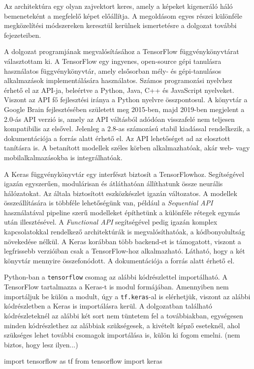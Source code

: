 Az architektúra egy olyan zajvektort keres, amely a képeket kigeneráló háló bemeneteként a megfelelő képet előállítja.
A megoldásom egyes részei különféle megközelítési módszereken keresztül kerülnek ismertetésre a dolgozat további fejezeteiben.



A dolgozat programjának megvalósításához a TensorFlow függvénykönyvtárat választottam ki. A TensorFlow egy ingyenes, open-source gépi tanulásra használatos függvénykönyvtár, amely elsősorban mély- és gépi-tanulásos alkalmazások implementálására használatos. Számos programozási nyelvhez érhető el az API-ja, beleértve a Python, Java, C++ és JavaScript nyelveket. Viszont az API fő fejlesztési iránya a Python nyelvre összpontosul. A könyvtár a Google Brain fejlesztésében született meg 2015-ben, majd 2019-ben megjelent a 2.0-ás API verzió is, amely az API váltásból adódóan visszafelé nem teljesen kompatibilis az elsővel. Jelenleg a 2.8-as számozású stabil kiadással rendelkezik, a dokumentációja a \cite{tensorflow} forrás alatt érhető el. Az API lehetőséget ad az elosztott tanításra is. A betanított modellek széles körben alkalmazhatóak, akár web- vagy mobilalkalmazásokba is integrálhatóak. 

A Keras függvénykönyvtár egy interfészt biztosít a TensorFlowhoz. Segítségével igazán egyszerűen, modulárisan és átláthatóan állíthatunk össze neurális hálózatokat. Az általa biztosított eszközkészlet igazán változatos. A modellek összeállítására is többféle lehetőségünk van, például a \textit{Sequential API} használatával pipeline szerű modelleket építhetünk a különféle rétegek egymás után illesztésével. A \textit{Functional API} segítségével pedig igazán komplex kapcsolatokkal rendelkező architektúrák is megvalósíthatóak, a kódbonyolultság növekedése nélkül. A Keras korábban több backend-et is támogatott, viszont a legfrissebb verzióiban csak a TensorFlow-hoz alkalmazható. Látható, hogy a két könyvtár mennyire összefonódott. A dokumentációja a \cite{keras} forrás alatt érhető el.

Python-ban a \texttt{tensorflow} csomag az alábbi kódrészlettel importálható. A TensorFlow tartalmazza a Keras-t is modul formájában. Amennyiben nem importáljuk be külön a modult, úgy a \texttt{tf.keras}-al is elérhetjük, viszont az alábbi kódrészletben a Keras is importálásra kerül. A dolgozatban található kódrészleteknél az alábbi két sort nem tüntetem fel a továbbiakban, egységesen minden kódrészlethez az alábbiak szükségesek, a kivételt képző eseteknél, ahol szükséges lehet további csomagok importálása is, külön ki fogom emelni. (nem biztos, hogy lesz ilyen...)
\begin{python}
import tensorflow as tf
from tensorflow import keras
\end{python}

